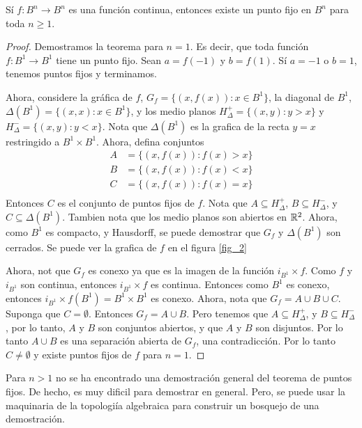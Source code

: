\begin{theorem}\label{thm_1}
    S\'i $f:B^n \rightarrow B^n$ es una funci\'on continua, entonces existe un
    punto fijo en $B^n$ para toda $n \geq 1$.
\end{theorem}
\begin{proof}
    Demostramos la teorema para $n=1$. Es decir, que toda funci\'on  $f:B^1
    \rightarrow B^1$ tiene un punto fijo. Sean $a=f(-1)$ y $b=f(1)$. S\'i $a=-1$ o
    $b=1$, tenemos puntos fijos y terminamos.

    Ahora, considere la gr\'afica de $f$,  $G_f=\{(x,f(x)) : x \in B^1\}$, la
    diagonal de $B^1$, $\Delta(B^1)=\{(x,x) : x \in B^1\}$, y los medio planos
    $H^+_\Delta=\{(x,y) : y>x\}$ y $H^-_\Delta=\{(x,y) : y<x\}$. Nota que
    $\Delta(B^1)$ es la grafica de la recta $y=x$ restringido a $B^1 \times B^1$.
    Ahora, defina conjuntos
    \begin{align*}
        A   &=      \{(x,f(x)) : f(x)>x\} \\
        B   &=      \{(x,f(x)) : f(x)<x\} \\
        C   &=      \{(x,f(x)) : f(x)=x\} \\
    \end{align*}
    Entonces $C$ es el conjunto de puntos fijos de $f$. Nota que $A \subseteq
    H^+_\Delta$,  $B \subseteq H^-_\Delta$, y $C \subseteq \Delta(B^1)$. Tambien
    nota que los medio planos son abiertos en
    $\mathbb{R}^2$. Ahora, como  $B^1$ es compacto, y Hausdorff, se puede demostrar que
    $G_f$ y  $\Delta(B^1)$ son cerrados. Se puede ver la grafica de $f$ en el
    figura \ref{fig_2}

    Ahora, not que $G_f$ es conexo ya que es la imagen de la funci\'on $i_{B^1}
    \times f$. Como  $f$ y  $i_{B^1}$ son continua, entonces  $i_{B^1} \times f$
    es continua. Entonces como  $B^1$ es conexo, entonces $i_{B^1} \times
    f(B^1)=B^1 \times B^1$ es conexo. Ahora, nota que $G_f=A \cup B \cup C$.
    Suponga que $C=\emptyset$. Entonces  $G_f=A \cup B$. Pero tenemos que $A
    \subseteq H^+_\Delta$, y $B \subseteq H^-_\Delta$, por lo tanto, $A$ y  $B$
    son conjuntos abiertos, y que  $A$  y $B$ son disjuntos. Por lo tanto $A \cup
    B$ es una separaci\'on abierta de  $G_f$, una contradicci\'on. Por lo tanto
    $C \neq \emptyset$ y existe puntos fijos de  $f$ para $n=1$.
\end{proof}
\begin{remark}
    Para $n > 1$ no se ha encontrado una demostraci\'on general del teorema de
    puntos fijos. De hecho, es muy dificil para demostrar en general. Pero, se
    puede usar la maquinaria de la topologi\'ia algebraica para construir un
    bosquejo de una demostraci\'on.
\end{remark}

